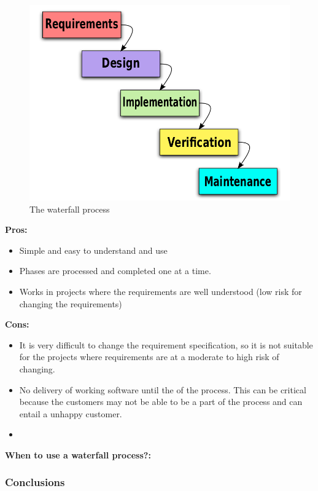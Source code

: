 \begin{figure}[ht!]
\centering
\includegraphics[scale=0.3]{pictures/Waterfall_model.png}
\caption{The waterfall process}
\label{overflow}
\end{figure}

{\bf Pros: }
\begin{itemize}
	\item Simple and easy to understand and use
	\item Phases are processed and completed one at a time.
	\item Works in projects where the requirements are well understood (low risk for changing the requirements)
\end{itemize}

{\bf Cons: }
\begin{itemize}
	\item It is very difficult to change the requirement specification, so it is not suitable for the projects where requirements are at a moderate to high risk of changing.
	\item No delivery of working software until the of the process. This can be critical because the customers may not
	be able to be a part of the process and can entail a unhappy customer.
	\item 

\end{itemize}

{\bf When to use a waterfall process?: }

\subsubsection{Conclusions}



